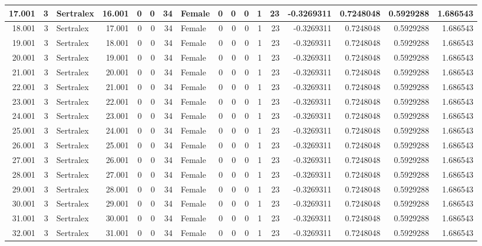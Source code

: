 \documentclass[
]{book}
\begin{document}
\begin{table}
\begin{tabular}[t]{r|r|l|r|r|r|r|l|r|r|r|r|r|r|r|r|r}
\hline
17.001 & 3 & Sertralex & 16.001 & 0 & 0 & 34 & Female & 0 & 0 & 0 & 1 & 23 & -0.3269311 & 0.7248048 & 0.5929288 & 1.686543\\
\hline
18.001 & 3 & Sertralex & 17.001 & 0 & 0 & 34 & Female & 0 & 0 & 0 & 1 & 23 & -0.3269311 & 0.7248048 & 0.5929288 & 1.686543\\
\hline
19.001 & 3 & Sertralex & 18.001 & 0 & 0 & 34 & Female & 0 & 0 & 0 & 1 & 23 & -0.3269311 & 0.7248048 & 0.5929288 & 1.686543\\
\hline
20.001 & 3 & Sertralex & 19.001 & 0 & 0 & 34 & Female & 0 & 0 & 0 & 1 & 23 & -0.3269311 & 0.7248048 & 0.5929288 & 1.686543\\
\hline
21.001 & 3 & Sertralex & 20.001 & 0 & 0 & 34 & Female & 0 & 0 & 0 & 1 & 23 & -0.3269311 & 0.7248048 & 0.5929288 & 1.686543\\
\hline
22.001 & 3 & Sertralex & 21.001 & 0 & 0 & 34 & Female & 0 & 0 & 0 & 1 & 23 & -0.3269311 & 0.7248048 & 0.5929288 & 1.686543\\
\hline
23.001 & 3 & Sertralex & 22.001 & 0 & 0 & 34 & Female & 0 & 0 & 0 & 1 & 23 & -0.3269311 & 0.7248048 & 0.5929288 & 1.686543\\
\hline
24.001 & 3 & Sertralex & 23.001 & 0 & 0 & 34 & Female & 0 & 0 & 0 & 1 & 23 & -0.3269311 & 0.7248048 & 0.5929288 & 1.686543\\
\hline
25.001 & 3 & Sertralex & 24.001 & 0 & 0 & 34 & Female & 0 & 0 & 0 & 1 & 23 & -0.3269311 & 0.7248048 & 0.5929288 & 1.686543\\
\hline
26.001 & 3 & Sertralex & 25.001 & 0 & 0 & 34 & Female & 0 & 0 & 0 & 1 & 23 & -0.3269311 & 0.7248048 & 0.5929288 & 1.686543\\
\hline
27.001 & 3 & Sertralex & 26.001 & 0 & 0 & 34 & Female & 0 & 0 & 0 & 1 & 23 & -0.3269311 & 0.7248048 & 0.5929288 & 1.686543\\
\hline
28.001 & 3 & Sertralex & 27.001 & 0 & 0 & 34 & Female & 0 & 0 & 0 & 1 & 23 & -0.3269311 & 0.7248048 & 0.5929288 & 1.686543\\
\hline
29.001 & 3 & Sertralex & 28.001 & 0 & 0 & 34 & Female & 0 & 0 & 0 & 1 & 23 & -0.3269311 & 0.7248048 & 0.5929288 & 1.686543\\
\hline
30.001 & 3 & Sertralex & 29.001 & 0 & 0 & 34 & Female & 0 & 0 & 0 & 1 & 23 & -0.3269311 & 0.7248048 & 0.5929288 & 1.686543\\
\hline
31.001 & 3 & Sertralex & 30.001 & 0 & 0 & 34 & Female & 0 & 0 & 0 & 1 & 23 & -0.3269311 & 0.7248048 & 0.5929288 & 1.686543\\
\hline
32.001 & 3 & Sertralex & 31.001 & 0 & 0 & 34 & Female & 0 & 0 & 0 & 1 & 23 & -0.3269311 & 0.7248048 & 0.5929288 & 1.686543\\

\end{tabular}
\end{table}
\end{document}
